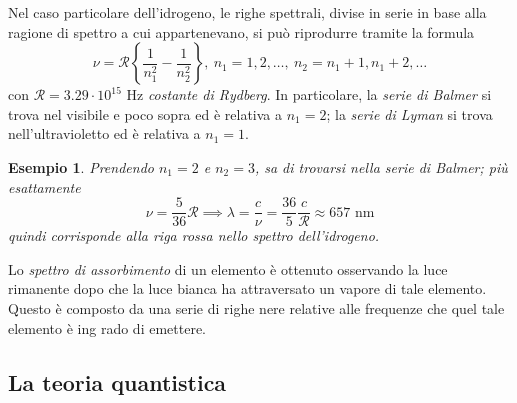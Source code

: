 \documentclass[11pt, a4paper]{scrartcl} %
\numberwithin{equation}{subsection}
\theoremstyle{style2}
\newtheorem{esempio}{Esempio}[section]
\theoremstyle{style1}
\begin{document}
Nel caso particolare dell'idrogeno, le righe spettrali, divise in serie in base alla ragione di spettro a cui appartenevano, si pu\`o riprodurre tramite la formula
\begin{equation}
	\nu  = \mathcal{R} \left\{ \frac{1}{n_1^2}- \frac{1}{n_2^2} \right\} , \ n_1 = 1,2,\ldots, \ n_2 = n_1+1, n_1+2, \ldots
\end{equation}
con $\mathcal{R} = 3.29 \cdot  10^{15} $ Hz \textit{costante di Rydberg}.
In particolare, la \textit{serie di Balmer} si trova nel visibile e poco sopra ed \`e relativa a $n_1=2$; la \textit{serie di Lyman} si trova nell'ultravioletto ed \`e relativa a $n_1=1$.

\begin{esempio}
Prendendo $n_1=2$ e $n_2=3$, sa di trovarsi nella serie di Balmer; pi\`u esattamente
\[
\nu  = \frac{5}{36}\mathcal{R} \implies \lambda = \frac{c}{\nu }= \frac{36}{5} \frac{c}{\mathcal{R} } \approx 657 \text{ nm}
\] 
quindi corrisponde alla riga rossa nello spettro dell'idrogeno.
\end{esempio}
Lo \textit{spettro di assorbimento} di un elemento \`e ottenuto osservando la luce rimanente dopo che la luce bianca ha attraversato un vapore di tale elemento.
Questo \`e composto da una serie di righe nere relative alle frequenze che quel tale elemento \`e ing rado di emettere.

\subsection{La teoria quantistica}
\end{document}
